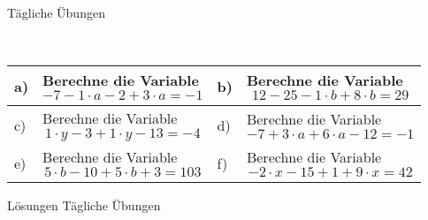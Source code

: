 \documentclass[12pt]{article}
\begin{document}
\centerline{{\Large Tägliche Übungen}} 
\vspace{1cm}
\noindent \\


\begin{xltabular}{\textwidth}{|C{0.75cm}|X|C{0.75cm}|X|}
\hline
a)&Berechne die Variable $$-7-1\cdot a-2+3\cdot a=-1$$
&
b)&Berechne die Variable $$12-25-1\cdot b+8\cdot b=29$$
\\\hline
c)&Berechne die Variable $$1\cdot y-3+1\cdot y-13=-4$$
&
d)&Berechne die Variable $$-7+3\cdot a+6\cdot a-12=-1$$
\\\hline
e)&Berechne die Variable $$5\cdot b-10+5\cdot b+3=103$$
&
f)&Berechne die Variable $$-2\cdot x-15+1+9\cdot x=42$$
\\\hline
\end{xltabular}
\vspace{0.5cm}
\newpage
{}
\centerline{{\large Lösungen Tägliche Übungen}} 
\vspace{0.5cm}
\end{document}
